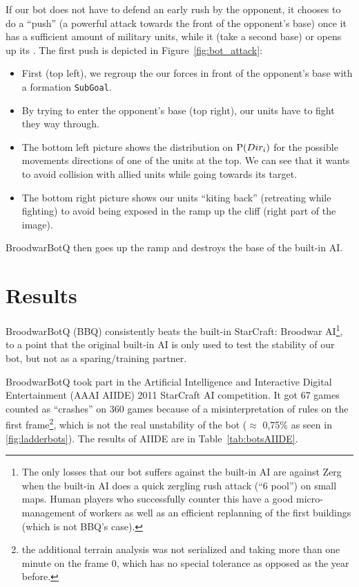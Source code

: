If our bot does not have to defend an early rush by the opponent, it chooses to do a ``push'' (a powerful attack towards the front of the opponent's base) once it has a sufficient amount of military units, while it  (take a second base) or opens up its . The first push is depicted in Figure~\ref{fig:bot_attack}: 
\begin{itemize}
    \item First (top left), we regroup the our forces in front of the opponent's base with a formation \texttt{SubGoal}.
    \item By trying to enter the opponent's base (top right), our units have to fight they way through.
    \item The bottom left picture shows the distribution on $\mathrm{P}(Dir_i)$ for the possible movements directions of one of the units at the top. We can see that it wants to avoid collision with allied units while going towards its target.
    \item The bottom right picture shows our units ``kiting back'' (retreating while fighting) to avoid being exposed in the ramp up the cliff (right part of the image).
\end{itemize}
BroodwarBotQ then goes up the ramp and destroys the base of the built-in AI.


\section{Results}

BroodwarBotQ (BBQ) consistently beats the built-in StarCraft: Broodwar AI\footnote{The only losses that our bot suffers against the built-in AI are against Zerg when the built-in AI does a quick zergling rush attack (``6 pool'') on small maps. Human players who successfully counter this have a good micro-management of workers as well as an efficient replanning of the first buildings (which is not BBQ's case).}, to a point that the original built-in AI is only used to test the stability of our bot, but not as a sparing/training partner.

BroodwarBotQ took part in the Artificial Intelligence and Interactive Digital Entertainment (AAAI AIIDE) 2011 StarCraft AI competition. It got 67 games counted as ``crashes'' on 360 games because of a misinterpretation of rules on the first frame\footnote{the additional terrain analysis was not serialized and taking more than one minute on the frame 0, which has no special tolerance as opposed as the year before.}, which is not the real unstability of the bot ($\approx$ 0,75\% as seen in \ref{fig:ladderbots}). The results of AIIDE are in Table~\ref{tab:botsAIIDE}.

